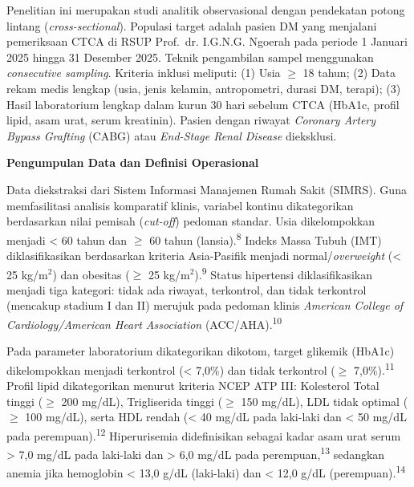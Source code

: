 \documentclass[
  indonesian,
]{agujournal2019}
\begin{document}
Penelitian ini merupakan studi analitik observasional dengan pendekatan
potong lintang (\emph{cross-sectional}). Populasi target adalah pasien
DM yang menjalani pemeriksaan CTCA di RSUP Prof.~dr. I.G.N.G. Ngoerah
pada periode 1 Januari 2025 hingga 31 Desember 2025. Teknik pengambilan
sampel menggunakan \emph{consecutive sampling}. Kriteria inklusi
meliputi: (1) Usia \(\ge\) 18 tahun; (2) Data rekam medis lengkap (usia,
jenis kelamin, antropometri, durasi DM, terapi); (3) Hasil laboratorium
lengkap dalam kurun 30 hari sebelum CTCA (HbA1c, profil lipid, asam
urat, serum kreatinin). Pasien dengan riwayat \emph{Coronary Artery
Bypass Grafting} (CABG) atau \emph{End-Stage Renal Disease} dieksklusi.

\textbf{Pengumpulan Data dan Definisi Operasional}

Data diekstraksi dari Sistem Informasi Manajemen Rumah Sakit (SIMRS).
Guna memfasilitasi analisis komparatif klinis, variabel kontinu
dikategorikan berdasarkan nilai pemisah (\emph{cut-off}) pedoman
standar. Usia dikelompokkan menjadi \textless{} 60 tahun dan \(\ge\) 60
tahun (lansia).\textsuperscript{8} Indeks Massa Tubuh (IMT)
diklasifikasikan berdasarkan kriteria Asia-Pasifik menjadi
normal/\emph{overweight} (\textless{} 25 kg/m\(^2\)) dan obesitas
(\(\ge\) 25 kg/m\(^2\)).\textsuperscript{9} Status hipertensi
diklasifikasikan menjadi tiga kategori: tidak ada riwayat, terkontrol,
dan tidak terkontrol (mencakup stadium I dan II) merujuk pada pedoman
klinis \emph{American College of Cardiology/American Heart Association}
(ACC/AHA).\textsuperscript{10}

Pada parameter laboratorium dikategorikan dikotom, target glikemik
(HbA1c) dikelompokkan menjadi terkontrol (\textless{} 7,0\%) dan tidak
terkontrol (\(\ge\) 7,0\%).\textsuperscript{11} Profil lipid
dikategorikan menurut kriteria NCEP ATP III: Kolesterol Total tinggi
(\(\ge\) 200 mg/dL), Trigliserida tinggi (\(\ge\) 150 mg/dL), LDL tidak
optimal (\(\ge\) 100 mg/dL), serta HDL rendah (\textless{} 40 mg/dL pada
laki-laki dan \textless{} 50 mg/dL pada perempuan).\textsuperscript{12}
Hiperurisemia didefinisikan sebagai kadar asam urat serum \textgreater{}
7,0 mg/dL pada laki-laki dan \textgreater{} 6,0 mg/dL pada
perempuan,\textsuperscript{13} sedangkan anemia jika hemoglobin
\textless{} 13,0 g/dL (laki-laki) dan \textless{} 12,0 g/dL
(perempuan).\textsuperscript{14}
\end{document}
